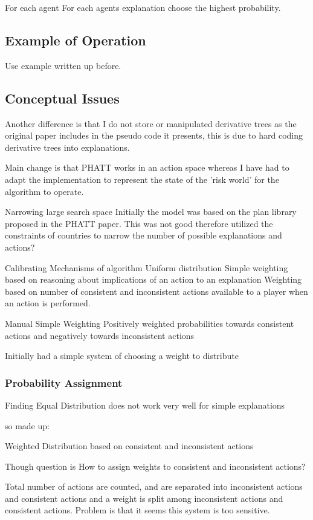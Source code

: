 \documentclass[parskip]{cs4rep}
\begin{document}
For each agent
For each agents explanation choose the highest probability.

\subsection{Example of Operation}

Use example written up before.

\subsection{Conceptual Issues}

Another difference is that I do not store or manipulated derivative trees as the original paper includes in the pseudo code it presents, this is due to hard coding derivative trees into explanations.

Main change is that PHATT works in an action space whereas I have had to adapt the implementation to represent the state of the 'risk world' for the algorithm to operate.

Narrowing large search space
Initially the model was based on the plan library proposed in the PHATT paper. This was not good therefore utilized the constraints of countries to narrow the number of possible explanations and actions?

Calibrating Mechanisms of algorithm
Uniform distribution
Simple weighting based on reasoning about implications of an action to an explanation
Weighting based on number of consistent and inconsistent actions available to a player when an action is performed.

Manual Simple Weighting
Positively weighted probabilities towards consistent actions and negatively towards inconsistent actions

Initially had a simple system of choosing a weight to distribute

\subsubsection{Probability Assignment}

Finding
Equal Distribution does not work very well for simple explanations

so made up:

Weighted Distribution based on consistent and inconsistent actions

Though question is How to assign weights to consistent and inconsistent actions?

Total number of actions are counted, and are separated into inconsistent actions and consistent actions and a weight is split among inconsistent actions and consistent actions. Problem is that it seems this system is too sensitive.
\end{document}
